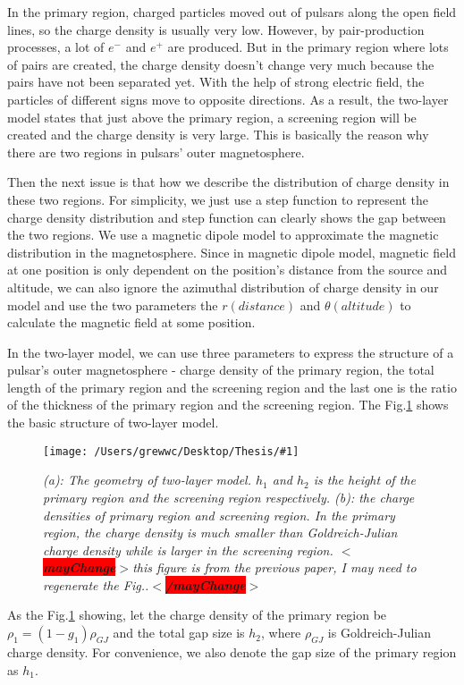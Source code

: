 \documentclass[12pt]{report}
\newcommand{\mycaption}[1]{\caption{\textit{\footnotesize #1}}}
\newcommand{\singleFig}[3]{
 \begin{figure}[!ht]
  \centering
  \texttt{[image: /Users/grewwc/Desktop/Thesis/\#1]}
  \mycaption{#3}
 \label{fig: #1}
 \end{figure}
}
\newcommand{\mayChange}[1]{
  $<$\colorbox{red}{\textbf{mayChange}}$>$#1$<$\colorbox{red}{\textbf{/mayChange}}$>$
}
\newcommand{\myComment}[1]{
  \newline
}
\begin{document}
      In the primary region, charged particles moved out of pulsars along the open field lines, 
      so the charge density is usually very low. 
      However, by pair-production processes, a lot of $e^{-}$ and $e^{+}$ are produced. 
      But in the primary region where lots of pairs are created, the charge density doesn't 
      change very much because the pairs have not been separated yet. With the help of strong 
      electric field, the particles of different signs move to opposite directions. 
      As a result, the two-layer model states that just above the primary region, a screening 
      region will be created and the charge density is very large. This is basically the reason why 
      there are two regions in pulsars' outer magnetosphere.

      Then the next issue is that how we describe the distribution of charge density in these two regions. 
      For simplicity, we just use a step function to represent the charge density distribution and step function 
      can clearly shows the gap between the two regions. We use a magnetic dipole model to approximate the 
      magnetic distribution in the magnetosphere. Since in magnetic dipole model, magnetic field at one position is 
      only dependent on the position's distance from the source and altitude, we can also ignore the azimuthal 
      distribution of charge density in our model and use the two parameters
      the $r (distance)$ and $\theta (altitude)$ to calculate the magnetic field at some position.

      In the two-layer model, we can use three parameters to express the structure of a pulsar's outer 
      magnetosphere - charge density of the primary region, the total length of the primary region and the 
      screening region and the last one is the ratio of the thickness of the primary region and the 
      screening region. The Fig.\ref{fig: charge_density} shows the basic structure of two-layer model. 

      \singleFig{charge_density}{0.6}{(a): The geometry of two-layer model. $h_{1}$ and $h_{2}$ is the height
      of the primary region and the screening region respectively. (b): the charge densities of primary region and 
      screening region. In the primary region, the charge density is much smaller than Goldreich-Julian charge density
      while is larger in the screening region. \mayChange{this figure is from the previous paper, I may need to 
      regenerate the Fig..}}

      As the Fig.\ref{fig: charge_density} showing, 
      let the charge density of the primary region be $\rho_1 = (1-g_{1}) \rho_{GJ}$ and the total gap size is 
      $h_{2}$, where $\rho_{GJ}$ is Goldreich-Julian charge density. For convenience, 
      we also denote the gap size of the primary region as $h_{1}$. 
      \myComment{Then we can calculate electric potential and electric field by solving the Poisson equation }
\end{document}
